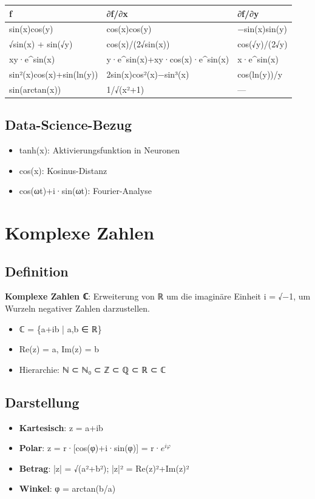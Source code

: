 \documentclass[11pt, a4paper]{article}
\begin{document}
{\small
\begin{tabularx}{\linewidth}{XXX}
\hline
\rowcolor{tableheadbg}
{\color{white}\textbf{f}} & {\color{white}\textbf{∂f/∂x}} & {\color{white}\textbf{∂f/∂y}} \\[2pt]
\hline
\endhead
\hline
\endfoot
sin(x)cos(y) & cos(x)cos(y) & −sin(x)sin(y) \\
√sin(x) + sin(√y) & cos(x)/(2√sin(x)) & cos(√y)/(2√y) \\
xy·e\textasciicircum{}sin(x) & y·e\textasciicircum{}sin(x)+xy·cos(x)·e\textasciicircum{}sin(x) & x·e\textasciicircum{}sin(x) \\
sin²(x)cos(x)+sin(ln(y)) & 2sin(x)cos²(x)−sin³(x) & cos(ln(y))/y \\
sin(arctan(x)) & 1/√(x²+1) & — \\
\end{tabularx}
}



\subsection{Data-Science-Bezug}
\begin{itemize}
  \item tanh(x): Aktivierungsfunktion in Neuronen
  \item cos(x): Kosinus-Distanz
  \item cos(ωt)+i·sin(ωt): Fourier-Analyse
\end{itemize}


\section{Komplexe Zahlen}


\subsection{Definition}
\textbf{Komplexe Zahlen ℂ}: Erweiterung von ℝ um die imaginäre Einheit i = √−1, um Wurzeln negativer Zahlen darzustellen.

\begin{itemize}
  \item ℂ = \{a+ib | a,b ∈ ℝ\}
  \item Re(z) = a, Im(z) = b
  \item Hierarchie: ℕ ⊂ ℕ₀ ⊂ ℤ ⊂ ℚ ⊂ ℝ ⊂ ℂ
\end{itemize}


\subsection{Darstellung}
\begin{itemize}
  \item \textbf{Kartesisch}: z = a+ib
  \item \textbf{Polar}: z = r·[cos(φ)+i·sin(φ)] = r·$e^{iφ}$
  \item \textbf{Betrag}: |z| = √(a²+b²); |z|² = Re(z)²+Im(z)²
  \item \textbf{Winkel}: φ = arctan(b/a)
\end{itemize}
\end{document}

